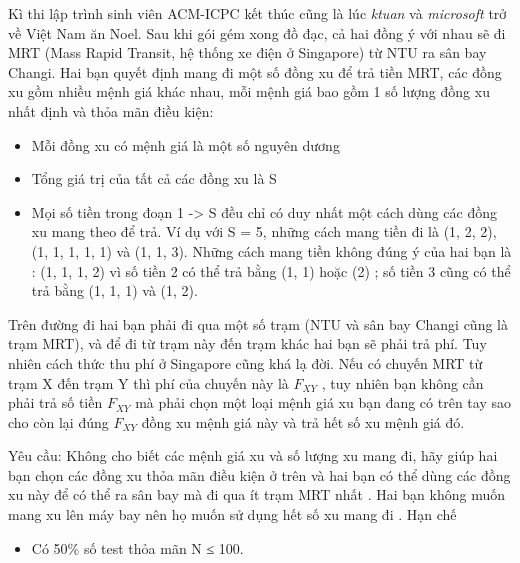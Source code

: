 Kì thi lập trình sinh viên ACM-ICPC kết thúc cũng là lúc   \textit{    ktuan   }   và   \textit{    microsoft   }   trở về Việt Nam ăn Noel. Sau khi gói gém xong đồ đạc, cả hai đồng ý với nhau sẽ đi MRT (Mass Rapid Transit, hệ thống xe điện ở Singapore) từ NTU ra sân bay Changi. Hai bạn quyết định mang đi một số đồng xu để trả tiền MRT, các đồng xu gồm nhiều mệnh giá khác nhau, mỗi mệnh giá bao gồm 1 số lượng đồng xu nhất định và thỏa mãn điều kiện:  
\begin{itemize}
	\item     Mỗi đồng xu có mệnh giá là một số nguyên dương   
	\item     Tổng giá trị của tất cả các đồng xu là S   
	\item     Mọi số tiền trong đoạn 1 -> S đều chỉ có duy nhất một cách dùng các đồng xu mang theo để trả. Ví dụ với S = 5, những cách mang tiền đi là (1, 2, 2), (1, 1, 1, 1, 1) và (1, 1, 3). Những cách mang tiền không đúng ý của hai bạn là : (1, 1, 1, 2) vì số tiền 2 có thể trả bằng (1, 1) hoặc (2) ; số tiền 3 cũng có thể trả bằng (1, 1, 1) và (1, 2).   
\end{itemize}

   Trên đường đi hai bạn phải đi qua một số trạm (NTU và sân bay Changi cũng là trạm MRT), và để đi từ trạm này đến trạm khác hai bạn sẽ phải trả phí. Tuy nhiên cách thức thu phí ở Singapore cũng khá lạ đời. Nếu có chuyến MRT từ trạm X đến trạm Y thì phí của chuyến này là $F_{XY}$   , tuy nhiên bạn không cần phải trả số tiền $F_{XY}$   mà       phải chọn một loại mệnh giá xu         bạn đang có        trên tay sao cho còn lại đúng $F_{XY}$    đồng xu mệnh giá này và trả hết số xu mệnh giá đó.     

       Yêu cầu:      Không cho biết các mệnh giá xu và số lượng xu mang đi, hãy giúp hai bạn chọn các đồng xu       thỏa mãn điều kiện ở trên      và hai bạn có thể dùng các đồng xu này để       có thể ra sân bay      mà       đi qua ít trạm MRT nhất      . Hai bạn không muốn mang xu lên máy bay nên họ muốn       sử dụng hết số xu mang đi      .
Hạn chế
\begin{itemize}
	\item     Có 50\% số test thỏa mãn N ≤ 100.   
\end{itemize}